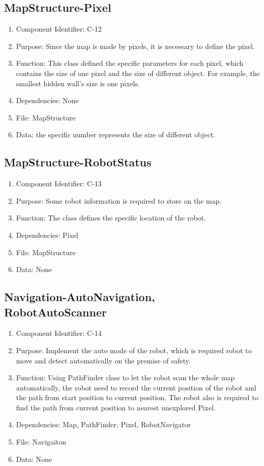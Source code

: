 \documentclass[11pt, a4paper]{report}
\begin{document}
\subsection{MapStructure-Pixel}
\begin{enumerate}
\item Component Identifier: C-12
\item Purpose: Since the map is made by pixels, it is necessary to define the pixel.
\item Function: This class defined the specific parameters for each pixel, which contains the size of one pixel and the size of different object. For example, the smallest hidden wall's size is one pixels.
\item Dependencies: None
\item File: MapStructure
\item Data: the specific number represents the size of different object.
\end{enumerate}

\subsection{MapStructure-RobotStatus}
\begin{enumerate}
\item Component Identifier: C-13
\item Purpose: Some robot information is required to store on the map.
\item Function: The class defines the specific location of the robot.
\item Dependencies: Pixel
\item File: MapStructure
\item Data: None
\end{enumerate}

\subsection{Navigation-AutoNavigation, RobotAutoScanner}
\begin{enumerate}
\item Component Identifier: C-14
\item Purpose: Implement the auto mode of the robot, which is required robot to move and detect automatically on the premise of safety.
\item Function: Using PathFinder class to let the robot scan the whole map automatically, the robot need to record the current position of the robot and the path from start position to current position. The robot also is required to find the path from current position to nearest unexplored Pixel.
\item Dependencies: Map, PathFinder, Pixel, RobotNavigator
\item File: Navigaiton
\item Data: None
\end{enumerate}
\end{document}

